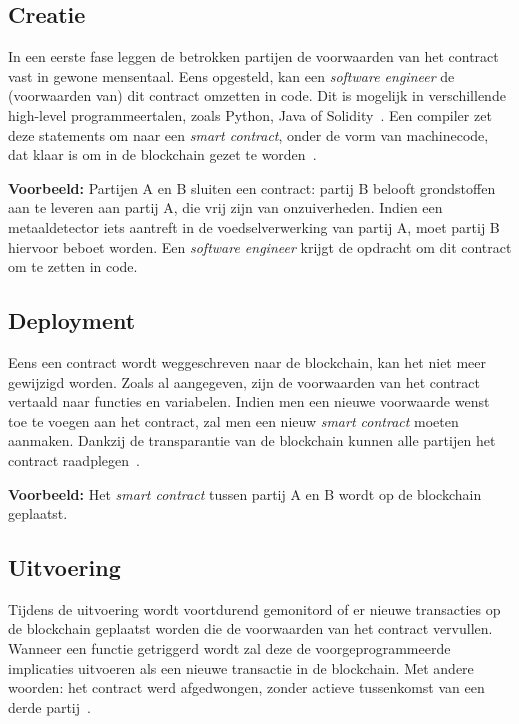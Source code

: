 \subsection{Creatie}
\label{sub:creatie}

In een eerste fase leggen de betrokken partijen de voorwaarden van het contract vast in gewone mensentaal. Eens opgesteld, kan een \textit{software engineer} de (voorwaarden van) dit contract omzetten in code. Dit is mogelijk in verschillende high-level programmeertalen, zoals Python, Java of Solidity~\autocite{Bahga2016}. Een compiler zet deze statements om naar een \textit{smart contract}, onder de vorm van machinecode, dat klaar is om in de blockchain gezet te worden~\autocite{Zheng2019}.

\textbf{Voorbeeld:}
Partijen A en B sluiten een contract: partij B belooft grondstoffen aan te leveren aan partij A, die vrij zijn van onzuiverheden. Indien een metaaldetector iets aantreft in de voedselverwerking van partij A, moet partij B hiervoor beboet worden. Een \textit{software engineer} krijgt de opdracht om dit contract om te zetten in code.

\subsection{Deployment}
\label{sub:deployment}

Eens een contract wordt weggeschreven naar de blockchain, kan het niet meer gewijzigd worden. Zoals al aangegeven, zijn de voorwaarden van het contract vertaald naar functies en variabelen. Indien men een nieuwe voorwaarde wenst toe te voegen aan het contract, zal men een nieuw \textit{smart contract} moeten aanmaken. Dankzij de transparantie van de blockchain kunnen alle partijen het contract raadplegen~\autocite{Zheng2019}.

\textbf{Voorbeeld:}
Het \textit{smart contract} tussen partij A en B wordt op de blockchain geplaatst.

\subsection{Uitvoering}
\label{sub:uitvoering}

Tijdens de uitvoering wordt voortdurend gemonitord of er nieuwe transacties op de blockchain geplaatst worden die de voorwaarden van het contract vervullen. Wanneer een functie getriggerd wordt zal deze de voorgeprogrammeerde implicaties uitvoeren als een nieuwe transactie in de blockchain. Met andere woorden: het contract werd afgedwongen, zonder actieve tussenkomst van een derde partij~\autocite{Delmolino2016}.

